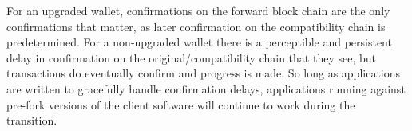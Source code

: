 For an upgraded wallet, confirmations on the forward block chain are
the only confirmations that matter, as later confirmation on the
compatibility chain is predetermined.  For a non-upgraded wallet there
is a perceptible and persistent delay in confirmation on the
original/compatibility chain that they see, but transactions do
eventually confirm and progress is made.  So long as applications are
written to gracefully handle confirmation delays, applications running
against pre-fork versions of the client software will continue to work
during the transition.
